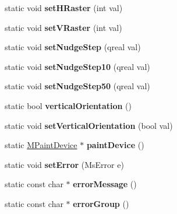 \begin{DoxyCompactItemize}
static void {\bfseries set\+H\+Raster} (int val)
\item 
\mbox{\label{class_ms_1_1_m_score_a236a0a1ad003ba0ce17a347d7cdeea1b}} 
static void {\bfseries set\+V\+Raster} (int val)
\item 
\mbox{\label{class_ms_1_1_m_score_a3ec62d6e8d68d90851b775475cb969f1}} 
static void {\bfseries set\+Nudge\+Step} (qreal val)
\item 
\mbox{\label{class_ms_1_1_m_score_ac6c3ad4f8aa315b2ecfe95b73b15f6b7}} 
static void {\bfseries set\+Nudge\+Step10} (qreal val)
\item 
\mbox{\label{class_ms_1_1_m_score_a3e4522b25066317e94a1ae6c22bdf2e4}} 
static void {\bfseries set\+Nudge\+Step50} (qreal val)
\item 
\mbox{\label{class_ms_1_1_m_score_aca131f1f53787e9bfa4fa5e3b564e7de}} 
static bool {\bfseries vertical\+Orientation} ()
\item 
\mbox{\label{class_ms_1_1_m_score_a5a0d5b7ec683b134571a587b79a842bc}} 
static void {\bfseries set\+Vertical\+Orientation} (bool val)
\item 
\mbox{\label{class_ms_1_1_m_score_a146eb63e792d9a1e4677b4b7b9f650e7}} 
static \hyperlink{class_ms_1_1_m_paint_device}{M\+Paint\+Device} $\ast$ {\bfseries paint\+Device} ()
\item 
\mbox{\label{class_ms_1_1_m_score_a5fc44789b80db3de16a23846532181d2}} 
static void {\bfseries set\+Error} (Ms\+Error e)
\item 
\mbox{\label{class_ms_1_1_m_score_a200403032155d4102c22039c5eb65938}} 
static const char $\ast$ {\bfseries error\+Message} ()
\item 
\mbox{\label{class_ms_1_1_m_score_aefca0af45fce36236429d72df8fe8f90}} 
static const char $\ast$ {\bfseries error\+Group} ()
\end{DoxyCompactItemize}
